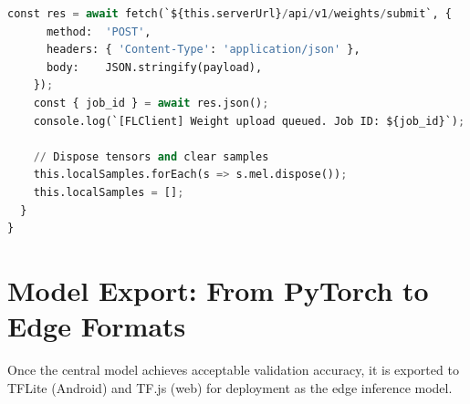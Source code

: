 \documentclass[11pt,a4paper]{article}
\begin{document}
\begin{lstlisting}[language=Python, caption={Web FL Client (TypeScript)}]
    const res = await fetch(`${this.serverUrl}/api/v1/weights/submit`, {
      method:  'POST',
      headers: { 'Content-Type': 'application/json' },
      body:    JSON.stringify(payload),
    });
    const { job_id } = await res.json();
    console.log(`[FLClient] Weight upload queued. Job ID: ${job_id}`);

    // Dispose tensors and clear samples
    this.localSamples.forEach(s => s.mel.dispose());
    this.localSamples = [];
  }
}
\end{lstlisting}

\section{Model Export: From PyTorch to Edge Formats}

Once the central model achieves acceptable validation accuracy, it is exported
to TFLite (Android) and TF.js (web) for deployment as the edge inference model.
\end{document}
